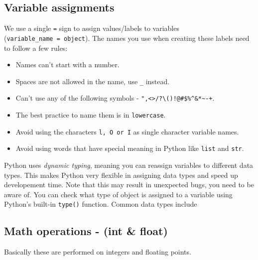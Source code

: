 \documentclass[11pt]{article}
\providecommand{\tightlist}{%
      \setlength{\itemsep}{0pt}\setlength{\parskip}{0pt}}
\begin{document}
    \subsection{Variable assignments}\label{variable-assignments}

We use a single \texttt{=} sign to assign values/labels to variables
(\texttt{variable\_name\ =\ object}). The names you use when creating
these labels need to follow a few rules:

\begin{itemize}
\tightlist
\item
  Names can't start with a number.
\item
  Spaces are not allowed in the name, use \texttt{\_} instead.
\item
  Can't use any of the following symbols -
  \texttt{\textquotesingle{}",\textless{}\textgreater{}/?\textbar{}\textbackslash{}()!@\#\$\%\^{}\&*\textasciitilde{}-+}.
\item
  The best practice to name them is in \texttt{lowercase}.
\item
  Avoid using the characters \texttt{l,\ O\ or\ I} as single character
  variable names.
\item
  Avoid using words that have special meaning in Python like
  \texttt{list} and \texttt{str}.
\end{itemize}

Python uses \emph{dynamic typing}, meaning you can reassign variables to
different data types. This makes Python very flexible in assigning data
types and speed up developement time. Note that this may result in
unexpected bugs, you need to be aware of. You can check what type of
object is assigned to a variable using Python's built-in \texttt{type()}
function. Common data types include

    \subsection{Math operations - (int \&
float)}\label{math-operations---int-float}

Basically these are performed on integers and floating points.
\end{document}
